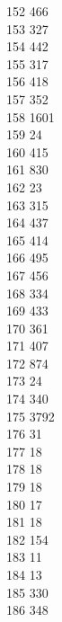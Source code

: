 { 152	466 \\
 153	327 \\
 154	442 \\
 155	317 \\
 156	418 \\
 157	352 \\
 158	1601 \\
 159	24 \\
 160	415 \\
 161	830 \\
 162	23 \\
 163	315 \\
 164	437 \\
 165	414 \\
 166	495 \\
 167	456 \\
 168	334 \\
 169	433 \\
 170	361 \\
 171	407 \\
 172	874 \\
 173	24 \\
 174	340 \\
 175	3792 \\
 176	31 \\
 177	18 \\
 178	18 \\
 179	18 \\
 180	17 \\
 181	18 \\
 182	154 \\
 183	11 \\
 184	13 \\
 185	330 \\
 186	348 \\
}
